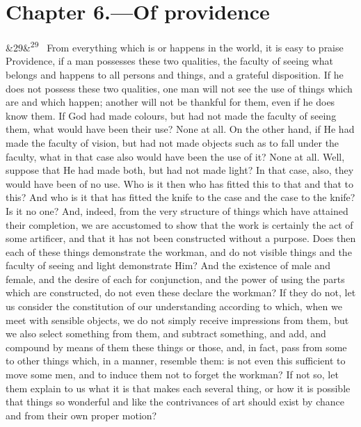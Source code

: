 \documentclass[12pt]{article}
\newcommand{\para}[1][]{\par\noindent\ifx&#1&\else\textsuperscript{\footnotesize #1}~\fi}
\begin{document}
\section*{Chapter 6.---Of providence}

\para[29] From everything which is or happens in the world, it is easy to praise Providence, if a man possesses these two qualities, the faculty of seeing what belongs and happens to all persons and things, and a grateful disposition. If he does not possess these two qualities, one man will not see the use of things which are and which happen; another will not be thankful for them, even if he does know them. If God had made colours, but had not made the faculty of seeing them, what would have been their use? None at all. On the other hand, if He had made the faculty of vision, but had not made objects such as to fall under the faculty, what in that case also would have been the use of it? None at all. Well, suppose that He had made both, but had not made light? In that case, also, they would have been of no use. Who is it then who has fitted this to that and that to this? And who is it that has fitted the knife to the case and the case to the knife? Is it no one? And, indeed, from the very structure of things which have attained their completion, we are accustomed to show that the work is certainly the act of some artificer, and that it has not been constructed without a purpose. Does then each of these things demonstrate the workman, and do not visible things and the faculty of seeing and light demonstrate Him? And the existence of male and female, and the desire of each for conjunction, and the power of using the parts which are constructed, do not even these declare the workman? If they do not, let us consider the constitution of our understanding according to which, when we meet with sensible objects, we do not simply receive impressions from them, but we also select something from them, and subtract something, and add, and compound by means of them these things or those, and, in fact, pass from some to other things which, in a manner, resemble them: is not even this sufficient to move some men, and to induce them not to forget the workman? If not so, let them explain to us what it is that makes each several thing, or how it is possible that things so wonderful and like the contrivances of art should exist by chance and from their own proper motion?
\end{document}
